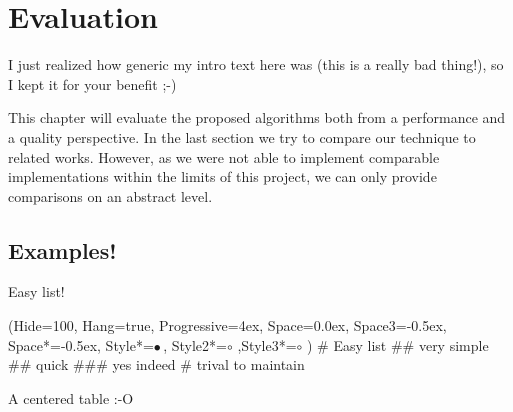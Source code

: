 \documentclass[thesis.tex]{subfiles}
\begin{document}
\chapter{Evaluation}\label{chap:eva}

I just realized how generic my intro text here was (this is a really bad thing!), so I kept it for your benefit ;-)

This chapter will evaluate the proposed algorithms both from a performance and a quality perspective.
In the last section we try to compare our technique to related works.
However, as we were not able to implement comparable implementations within the limits of this project, we can only provide comparisons on an abstract level.

\section{Examples!} \label{sec:eva:examples}
Easy list!

\begin{easylist}
\ListProperties(Hide=100, Hang=true, Progressive=4ex, Space=0.0ex, Space3=-0.5ex, Space*=-0.5ex, Style*=$\bullet\,$,
Style2*=$\circ$ ,Style3*=$\circ$ )
# Easy list
## very simple
## quick
### yes indeed
# trival to maintain
\end{easylist}

A centered table :-O
\end{document}
